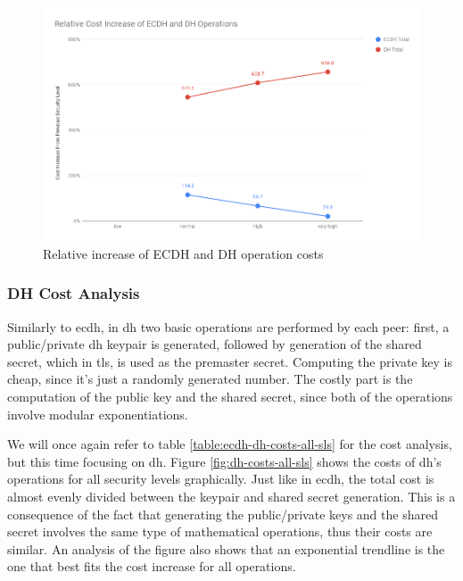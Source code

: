 \documentclass{llncs}
\begin{document}
  \begin{figure}
    \centering
    \includegraphics[width=1.0\textwidth]{img/ecdh_dh_relative_cost_increase.png}
    \centering \caption{\label{fig:ecdh-dh-relative-cost-increase} Relative increase of ECDH and DH operation costs}
  \end{figure}

\subsubsection{DH Cost Analysis}

Similarly to \gls{ecdh}, in \gls{dh} two basic operations are performed by each peer: first, a public/private \gls{dh} keypair is generated, followed
by generation of the shared secret, which in \gls{tls}, is used as the premaster secret. Computing the private key is cheap, since it's just a randomly
generated number. The costly part is the computation of the public key and the shared secret, since both of the operations involve modular exponentiations.

We will once again refer to table \ref{table:ecdh-dh-costs-all-sls} for the cost analysis, but this time focusing on \gls{dh}. Figure
\ref{fig:dh-costs-all-sls} shows the costs of \gls{dh}'s operations for all security levels graphically. Just like in \gls{ecdh}, the total cost
is almost evenly divided between the keypair and shared secret generation. This is a consequence of the fact that generating the public/private keys
and the shared secret involves the same type of mathematical operations, thus their costs are similar. An analysis of the figure
also shows that an exponential trendline is the one that best fits the cost increase for all operations.
\end{document}
